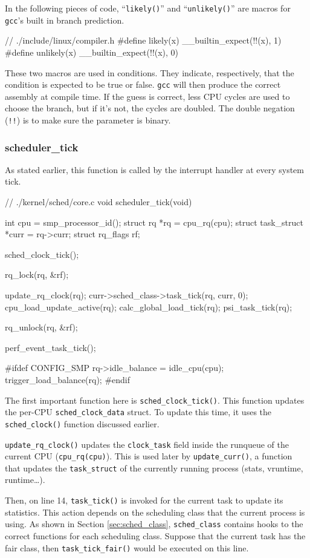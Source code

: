 In the following pieces of code, ``\verb|likely()|'' and ``\verb|unlikely()|'' are macros for \verb|gcc|'s built in branch prediction.
\begin{code}
// ./include/linux/compiler.h
#define likely(x)       __builtin_expect(!!(x), 1)
#define unlikely(x)     __builtin_expect(!!(x), 0)
\end{code}
These two macros are used in conditions. They indicate, respectively, that the condition is expected to be true or false. \verb|gcc| will then produce the correct assembly at compile time. If the guess is correct, less CPU cycles are used to choose the branch, but if it's not, the cycles are doubled. The double negation (\verb|!!|) is to make sure the parameter is binary.

\subsubsection{scheduler\_tick}
As stated earlier, this function is called by the interrupt handler at every system tick.

\begin{code}
// ./kernel/sched/core.c
void scheduler_tick(void)
{
	int cpu = smp_processor_id();
	struct rq *rq = cpu_rq(cpu);
	struct task_struct *curr = rq->curr;
	struct rq_flags rf;

	sched_clock_tick();

	rq_lock(rq, &rf);

	update_rq_clock(rq);
	curr->sched_class->task_tick(rq, curr, 0);
	cpu_load_update_active(rq);
	calc_global_load_tick(rq);
	psi_task_tick(rq);

	rq_unlock(rq, &rf);

	perf_event_task_tick();

#ifdef CONFIG_SMP
	rq->idle_balance = idle_cpu(cpu);
	trigger_load_balance(rq);
#endif
}
\end{code}
The first important function here is \verb|sched_clock_tick()|. This function updates the per-CPU \verb|sched_clock_data| struct. To update this time, it uses the \verb|sched_clock()| function discussed earlier.

\verb|update_rq_clock()| updates the \verb|clock_task| field inside the runqueue of the current CPU (\verb|cpu_rq(cpu)|). This is used later by \verb|update_curr()|, a function that updates the \verb|task_struct| of the currently running process (stats, vruntime, runtime\dots).

Then, on line 14, \verb|task_tick()| is invoked for the current task to update its statistics. This action depends on the scheduling class that the current process is using. As shown in Section \ref{sec:sched_class}, \verb|sched_class| contains hooks to the correct functions for each scheduling class. Suppose that the current task has the fair class, then \verb|task_tick_fair()| would be executed on this line.

